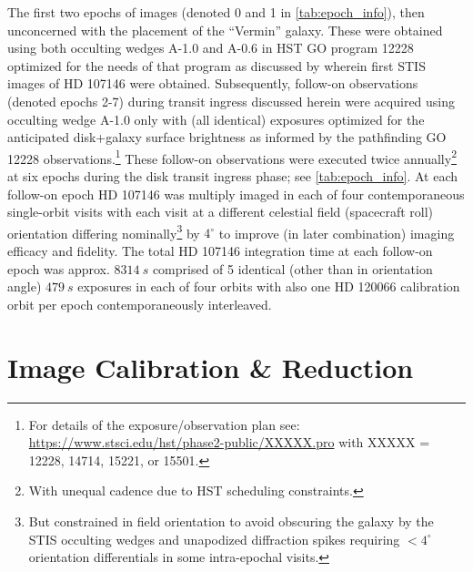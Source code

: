 \documentclass{aa}
\begin{document}
The first two epochs of images (denoted 0 and 1 in \autoref{tab:epoch_info}), then unconcerned with the placement of the “Vermin” galaxy. These were obtained using both occulting wedges A-1.0 and A-0.6 in HST GO program 12228 optimized for the needs of that program as discussed by \cite{schneider2014probing} wherein first STIS images of HD 107146 were obtained. Subsequently, follow-on observations (denoted epochs 2-7) during transit ingress discussed herein were acquired using occulting wedge A-1.0 only with (all identical) exposures optimized for the anticipated disk+galaxy surface brightness as informed by the pathfinding GO 12228 observations.\footnote{For details of the exposure/observation plan see: \url{https://www.stsci.edu/hst/phase2-public/XXXXX.pro} with XXXXX = 12228, 14714, 15221, or 15501.} 
These follow-on observations were executed twice annually\footnote{With unequal cadence due to HST scheduling constraints.} at six epochs during the disk transit ingress phase; see \autoref{tab:epoch_info}. At each follow-on epoch HD 107146 was multiply imaged in each of four contemporaneous single-orbit visits with each visit at a different celestial field (spacecraft roll) orientation differing nominally\footnote{But constrained in field orientation to avoid obscuring the galaxy by the STIS occulting wedges and unapodized diffraction spikes requiring $< 4^{\circ}$ orientation differentials in some intra-epochal visits.} by $4^{\circ}$ to improve (in later combination) imaging efficacy and fidelity.  The total HD 107146 integration time at each follow-on epoch was approx. $8314 ~s$ comprised of 5 identical (other than in orientation angle) $479~ s$ exposures in each of four orbits with also one HD 120066 calibration orbit per epoch contemporaneously interleaved.

\section{Image Calibration \& Reduction}
\end{document}
